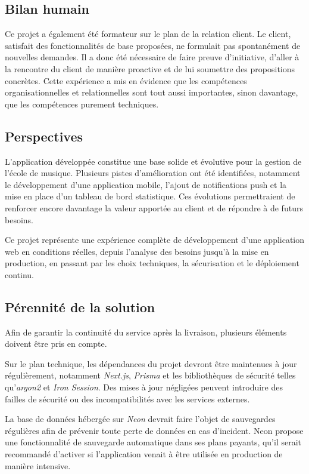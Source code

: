 \documentclass{article}
\begin{document}
\subsection*{Bilan humain}

Ce projet a également été formateur sur le plan de la relation 
client. Le client, satisfait des fonctionnalités de base proposées, 
ne formulait pas spontanément de nouvelles demandes. Il a donc été 
nécessaire de faire preuve d'initiative, d'aller à la rencontre du 
client de manière proactive et de lui soumettre des propositions 
concrètes. Cette expérience a mis en évidence que les compétences 
organisationnelles et relationnelles sont tout aussi importantes, 
sinon davantage, que les compétences purement techniques.

\subsection*{Perspectives}

L'application développée constitue une base solide et évolutive 
pour la gestion de l'école de musique. Plusieurs pistes 
d'amélioration ont été identifiées, notamment le développement 
d'une application mobile, l'ajout de notifications push et la 
mise en place d'un tableau de bord statistique. Ces évolutions 
permettraient de renforcer encore davantage la valeur apportée 
au client et de répondre à de futurs besoins.

Ce projet représente une expérience complète de développement 
d'une application web en conditions réelles, depuis l'analyse 
des besoins jusqu'à la mise en production, en passant par les 
choix techniques, la sécurisation et le déploiement continu.


\subsection*{Pérennité de la solution}

Afin de garantir la continuité du service après la livraison, 
plusieurs éléments doivent être pris en compte.

Sur le plan technique, les dépendances du projet devront être 
maintenues à jour régulièrement, notamment \textit{Next.js}, 
\textit{Prisma} et les bibliothèques de sécurité telles 
qu'\textit{argon2} et \textit{Iron Session}. Des mises à jour 
négligées peuvent introduire des failles de sécurité ou des 
incompatibilités avec les services externes.

La base de données hébergée sur \textit{Neon} devrait faire 
l'objet de sauvegardes régulières afin de prévenir toute perte 
de données en cas d'incident. Neon propose une fonctionnalité 
de sauvegarde automatique dans ses plans payants, qu'il serait 
recommandé d'activer si l'application venait à être utilisée 
en production de manière intensive.
\end{document}
